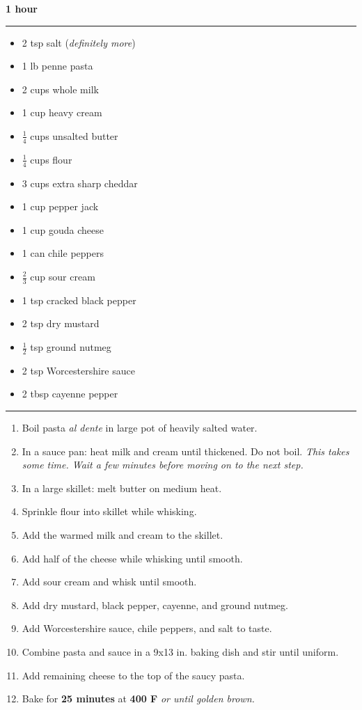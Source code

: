  \hfill {\large \textbf{1 hour}}

\vspace{15pt} \hrule \vspace{15pt}
\begin{itemize}
	\item 2 tsp salt (\textit{definitely more})
	\item 1 lb penne pasta
	\item 2 cups whole milk
	\item 1 cup heavy cream
	\item $\frac{1}{4}$ cups unsalted butter
	\item $\frac{1}{4}$ cups flour
	\item 3 cups extra sharp cheddar
	\item 1 cup pepper jack
	\item 1 cup gouda cheese
	\item 1 can chile peppers
	\item $\frac{2}{3}$ cup sour cream
	\item 1 tsp cracked black pepper
	\item 2 tsp dry mustard
	\item $\frac{1}{2}$ tsp ground nutmeg
	\item 2 tsp Worcestershire sauce
	\item 2 tbsp cayenne pepper
\end{itemize}

\vspace{15pt} \hrule \vspace{15pt}
\begin{enumerate}
	\item Boil pasta \textit{al dente} in large pot of heavily salted water.
	\item In a sauce pan: heat milk and cream until thickened. Do not boil. \textit{This takes some time. Wait a few minutes before moving on to the next step.}
	\item In a large skillet: melt butter on medium heat.
	\item Sprinkle flour into skillet while whisking.
	\item Add the warmed milk and cream to the skillet.
	\item Add half of the cheese while whisking until smooth.
	\item Add sour cream and whisk until smooth.
	\item Add dry mustard, black pepper, cayenne, and ground nutmeg.
	\item Add Worcestershire sauce, chile peppers, and salt to taste.
	\item Combine pasta and sauce in a 9x13 in. baking dish and stir until uniform.
	\item Add remaining cheese to the top of the saucy pasta.
	\item Bake for \textbf{25 minutes} at \textbf{400 F} \textit{or until golden brown.}
\end{enumerate}
